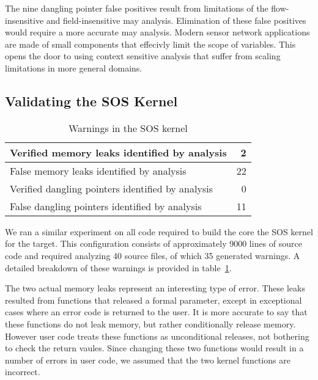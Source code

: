 \smallskip{}

The nine dangling pointer false positives result from limitations of
the flow-insensitive and field-insensitive may analysis.  Elimination
of these false positives would require a more accurate may analysis.
Modern sensor network applications are made of small components that
effecivly limit the scope of variables.  This opens the door to using
context sensitive analysis that suffer from scaling limitations in
more general domains.


\subsection{Validating the SOS Kernel}

\begin{table}
\caption{Warnings in the SOS kernel}
%
\label{tab:kernel}
\centering 
\begin{tabular}{| l | r |}
    \hline 
    Verified memory leaks identified by analysis & 2 \\
    \hline
    False memory leaks identified by analysis & 22 \\
    \hline 
    Verified dangling pointers identified by analysis & 0 \\
    \hline 
    False dangling pointers identified by analysis & 11 \\
    \hline 
\end{tabular} 
%
\end{table}


We ran a similar experiment on all code required to build the core the
SOS kernel for the  target.  This configuration consists
of approximately 9000 lines of source code and required analyzing 40
source files, of which 35 generated warnings.  A detailed breakdown of
these warnings is provided in table~\ref{tab:kernel}.

%
The two actual memory leaks represent an interesting type of error.
These leaks resulted from functions that released a formal parameter,
except in exceptional cases where an error code is returned to the
user.  It is more accurate to say that these functions do not leak
memory, but rather conditionally release memory.  However user code
treats these functions as unconditional releases, not bothering to
check the return vaules.  Since changing these two functions would
result in a number of errors in user code, we assumed that the two
kernel functions are incorrect.

